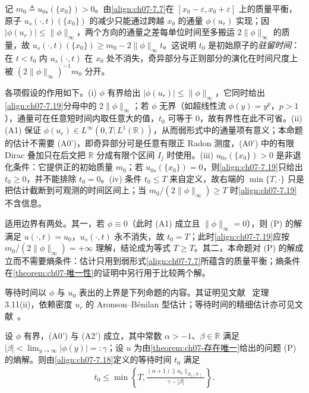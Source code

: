 \documentclass[../../main.tex]{subfiles}%
\begin{document}
\begin{remark}\label{remark:ch07-7.2.1动机}
记 $m_0\triangleq u_{0s}(\{x_0\})>0$。由\eqref{align:ch07-7.7}在 $[x_0-\varepsilon,x_0+\varepsilon]$ 上的质量平衡，原子 $u_s(\cdot,t)(\{x_0\})$ 的减少只能通过跨越 $x_0$ 的通量 $\phi(u_r)$ 实现；因 $|\phi(u_r)|\leqslant\|\phi\|_\infty$，两个方向的通量之差每单位时间至多搬运 $2\|\phi\|_\infty$ 的质量，故 $u_s(\cdot,t)(\{x_0\})\geqslant m_0-2\|\phi\|_\infty t$。这说明 $t_0$ 是初始原子的\emph{驻留时间}：在 $t<t_0$ 内 $u_s(\cdot,t)$ 在 $x_0$ 处不消失，奇异部分与正则部分的演化在时间尺度上被 $(2\|\phi\|_\infty)^{-1}m_0$ 分开。

各项假设的作用如下。(i) $\phi$ 有界给出 $|\phi(u_r)|\leqslant\|\phi\|_\infty$，它同时给出\eqref{align:ch07-7.19}分母中的 $2\|\phi\|_\infty$；若 $\phi$ 无界（如超线性流 $\phi(y)=y^p$，$p>1$），通量可在任意短时间内取任意大的值，$t_0$ 可等于 $0$，故有界性在此不可省。(ii) (A1) 保证 $\phi(u_r)\in L^\infty(0,T;L^1(\mathbb{R}))$，从而弱形式中的通量项有意义；本命题的估计不需要 (A0')，即奇异部分可是任意有限正 Radon 测度，(A0') 中的有限 Dirac 叠加只在后文把 $\mathbb{R}$ 分成有限个区间 $I_j$ 时使用。(iii) $u_{0s}(\{x_0\})>0$ 是非退化条件：它提供正的初始质量 $m_0$；若 $u_{0s}(\{x_0\})=0$，则\eqref{align:ch07-7.19}只给出 $t_0\geqslant0$，并不能排除 $t_0=0$。(iv) 条件 $t_0\leqslant T$ 来自定义，故右端的 $\min\{T,\cdot\}$ 只是把估计截断到可观测的时间区间上；当 $m_0/(2\|\phi\|_\infty)\geqslant T$ 时\eqref{align:ch07-7.19}不含信息。

适用边界有两处。其一，若 $\phi\equiv0$（此时 (A1) 成立且 $\|\phi\|_\infty=0$），则 (P) 的解满足 $u(\cdot,t)=u_0$，$u_s(\cdot,t)$ 永不消失，故 $t_0=T$；此时\eqref{align:ch07-7.19}应按 $m_0/(2\|\phi\|_\infty)=+\infty$ 理解，结论成为等式 $T\geqslant T$。其二，本命题对 (P) 的解成立而不需要熵条件：估计只用到弱形式\eqref{align:ch07-7.7}所蕴含的质量平衡；熵条件在\cref{theorem:ch07-唯一性}的证明中另行用于比较两个解。
\end{remark}

等待时间以 $\phi$ 与 $u_0$ 表出的上界是下列命题的内容。其证明见文献~\cite{ref18} 定理 3.11(ii)，依赖密度 $u_r$ 的 Aronson--Bénilan 型估计；等待时间的精细估计亦可见文献~\cite{ref20}。

\begin{proposition}\label{proposition:ch07-7.2.2}
设 $\phi$ 有界，(A0') 与 (A2') 成立，其中常数 $\alpha>-1$、$\beta\in\mathbb{R}$ 满足 $|\beta|<\lim_{y\to\infty}|\phi(y)|=:\gamma$；设 $u$ 为由\cref{theorem:ch07-存在唯一}给出的问题 (P) 的熵解。则由\eqref{align:ch07-7.18}定义的等待时间 $t_0$ 满足
\begin{align}
t_0\leqslant\min\left\{T,\frac{(\alpha+1)\|u_0\|_{\mathscr{R}_f(\mathbb{R})}}{\gamma-|\beta|}\right\}. \label{align:ch07-7.20}
\end{align}
\end{proposition}
\end{document}
